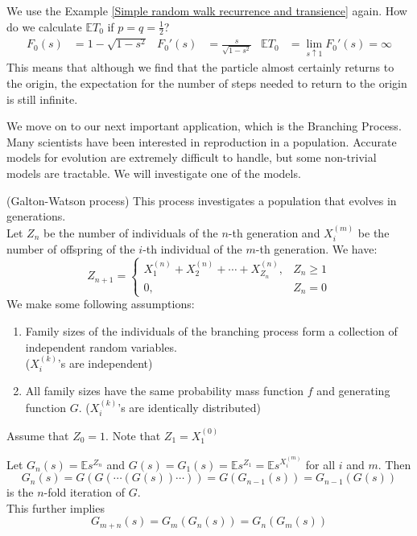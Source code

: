 \documentclass{huhtakm-template-book}
\newcommand{\expect}{\mathbb{E}}
\begin{document}
    \begin{eg}
        We use the Example \ref{Simple random walk recurrence and transience} again. How do we calculate $\expect T_{0}$ if $p=q=\frac{1}{2}$?
        \begin{align*}
            F_{0}(s)&=1-\sqrt{1-s^{2}} & F_{0}'(s)&=\frac{s}{\sqrt{1-s^{2}}} & \expect T_{0}&=\lim_{s\uparrow 1}F_{0}'(s)=\infty
        \end{align*}
        This means that although we find that the particle almost certainly returns to the origin, the expectation for the number of steps needed to return to the origin is still infinite.
    \end{eg}
    We move on to our next important application, which is the Branching Process. Many scientists have been interested in reproduction in a population. Accurate models for evolution are extremely difficult to handle, but some non-trivial models are tractable. We will investigate one of the models.
    \begin{eg}(Galton-Watson process) 
        This process investigates a population that evolves in generations.\\
        Let $Z_{n}$ be the number of individuals of the $n$-th generation and $X_{i}^{(m)}$ be the number of offspring of the $i$-th individual of the $m$-th generation. We have:
        \begin{equation*}
            Z_{n+1}=\begin{cases}
                X_{1}^{(n)}+X_{2}^{(n)}+\cdots+X_{Z_{n}}^{(n)}, &Z_{n}\geq 1\\
                0, &Z_{n}=0
            \end{cases}
        \end{equation*}
        We make some following assumptions:
        \begin{enumerate}
            \item Family sizes of the individuals of the branching process form a collection of independent random variables.\\
            ($X_{i}^{(k)}$'s are independent)
            \item All family sizes have the same probability mass function $f$ and generating function $G$. ($X_{i}^{(k)}$'s are identically distributed)
        \end{enumerate}
        Assume that $Z_{0}=1$. Note that $Z_{1}=X_{1}^{(0)}$
    \end{eg}
    \begin{thm}
        \label{Chapter 5 Theorem Galton-Watson process PGF n-fold iterate properties}
        Let $G_{n}(s)=\expect s^{Z_{n}}$ and $G(s)=G_{1}(s)=\expect s^{Z_{1}}=\expect s^{X_{i}^{(m)}}$ for all $i$ and $m$. Then
        \begin{equation*}
            G_{n}(s)=G(G(\cdots(G(s))\cdots))=G(G_{n-1}(s))=G_{n-1}(G(s))
        \end{equation*}
        is the $n$-fold iteration of $G$.\\
        This further implies
        \begin{equation*}
            G_{m+n}(s)=G_{m}(G_{n}(s))=G_{n}(G_{m}(s))
        \end{equation*}
    \end{thm}
\end{document}
